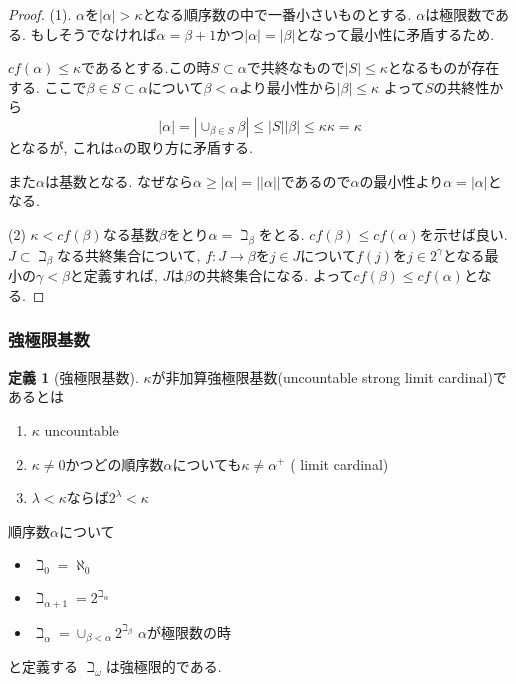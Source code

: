 \documentclass[dvipdfmx,a4paper,11pt]{article}
\theoremstyle{definition}
\newtheorem{dfn}[thm]{定義}
\begin{document}
\begin{proof}
(1). $\alpha$を$|\alpha|>\kappa$となる順序数の中で一番小さいものとする.
$\alpha$は極限数である. もしそうでなければ$\alpha = \beta +1$かつ$|\alpha|=|\beta|$となって最小性に矛盾するため.

$cf(\alpha) \le \kappa$であるとする.この時$S \subset \alpha$で共終なもので$|S| \le \kappa$となるものが存在する.
ここで$\beta \in S \subset \alpha$について$\beta < \alpha$より最小性から$|\beta| \le \kappa$
よって$S$の共終性から
$$
|\alpha|
=
|\cup_{\beta \in S}\beta|
\le 
|S| |\beta|
\le
\kappa \kappa = \kappa
$$ 
となるが, これは$\alpha$の取り方に矛盾する.

また$\alpha$は基数となる. 
なぜなら$\alpha\ge |\alpha| = || \alpha||$であるので$\alpha$の最小性より$\alpha =|\alpha| $となる. 

(2)
$\kappa < cf(\beta)$なる基数$\beta$をとり$\alpha = \beth_{\beta}$をとる.
$cf(\beta) \le cf(\alpha )$を示せば良い.
$J \subset \beth_{\beta}$なる共終集合について, $f: J \to \beta$を$j \in J$について$f(j)$を$j \in 2^{\gamma}$となる最小の$\gamma < \beta$と定義すれば, $J$は$\beta$の共終集合になる. 
よって$cf(\beta) \le cf(\alpha )$となる. 

\end{proof}



\subsubsection{強極限基数}

 \begin{tcolorbox}
 [colback = white, colframe = green!35!black, fonttitle = \bfseries,breakable = true]
\begin{dfn}[強極限基数]
$\kappa$が非加算強極限基数(uncountable strong limit cardinal)であるとは
\begin{enumerate}
\item $\kappa$ uncountable
\item $\kappa \neq 0$かつどの順序数$\alpha$についても$\kappa \neq \alpha^{+}$ ( limit cardinal)
\item  $\lambda < \kappa$ならば$2^{\lambda} < \kappa$
\end{enumerate}
 \end{dfn}
 \end{tcolorbox}
 
 順序数$\alpha$について

\begin{itemize}
\item $\beth_0 = \aleph_0$
\item $\beth_{\alpha+1}= 2^{\beth_{\alpha}}$
\item $\beth_{\alpha}= \cup_{\beta < \alpha }2^{\beth_{\beta}}$ $\alpha$が極限数の時
\end{itemize}
と定義する
$\beth_{\omega}$は強極限的である. 
\end{document}
